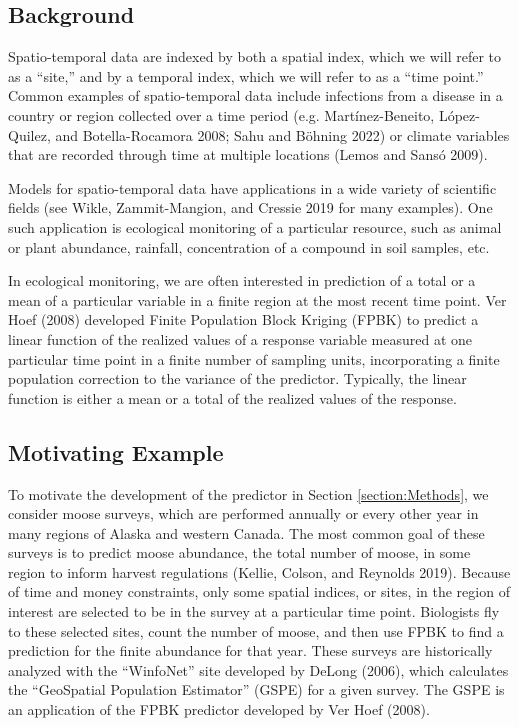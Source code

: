 \documentclass[]{article}    %
\begin{document}
\hypertarget{background}{%
\subsection{Background}\label{background}}

Spatio-temporal data are indexed by both a spatial index, which we will
refer to as a ``site,'' and by a temporal index, which we will refer to
as a ``time point.'' Common examples of spatio-temporal data include
infections from a disease in a country or region collected over a time
period (e.g. Martínez-Beneito, López-Quilez, and Botella-Rocamora 2008;
Sahu and Böhning 2022) or climate variables that are recorded through
time at multiple locations (Lemos and Sansó 2009).

Models for spatio-temporal data have applications in a wide variety of
scientific fields (see Wikle, Zammit-Mangion, and Cressie 2019 for many
examples). One such application is ecological monitoring of a particular
resource, such as animal or plant abundance, rainfall, concentration of
a compound in soil samples, etc.

In ecological monitoring, we are often interested in prediction of a
total or a mean of a particular variable in a finite region at the most
recent time point. Ver Hoef (2008) developed Finite Population Block
Kriging (FPBK) to predict a linear function of the realized values of a
response variable measured at one particular time point in a finite
number of sampling units, incorporating a finite population correction
to the variance of the predictor. Typically, the linear function is
either a mean or a total of the realized values of the response.

\hypertarget{motivating-example}{%
\subsection{Motivating Example}\label{motivating-example}}

To motivate the development of the predictor in Section
\ref{section:Methods}, we consider moose surveys, which are performed
annually or every other year in many regions of Alaska and western
Canada. The most common goal of these surveys is to predict moose
abundance, the total number of moose, in some region to inform harvest
regulations (Kellie, Colson, and Reynolds 2019). Because of time and
money constraints, only some spatial indices, or sites, in the region of
interest are selected to be in the survey at a particular time point.
Biologists fly to these selected sites, count the number of moose, and
then use FPBK to find a prediction for the finite abundance for that
year. These surveys are historically analyzed with the ``WinfoNet'' site
developed by DeLong (2006), which calculates the ``GeoSpatial Population
Estimator'' (GSPE) for a given survey. The GSPE is an application of the
FPBK predictor developed by Ver Hoef (2008).
\end{document}
